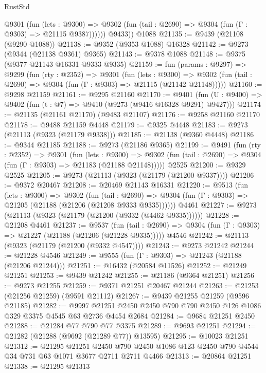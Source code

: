 \begin{lexlean}{RustStd}
\begin{coremodule}
{\begin{coremodule}
{{{{{{{{{{{{{{{{{{{{{{{{{{{{{{{{{{{{{{{{{{{{{{{{{{{{{{{            @9301
              (fun (lets : @9300) =>
              @9302 (fun (tail : @2690) => @9304 (fun (Γ : @9303) => @21115 @9387))))))
        @9433))
    @1088
@21135 := @9439 (@21108 (@9290 @1088))
@21138 := @9352 (@9353 @1088) @16328
@21142 := @9273 (@9344 (@21138 @9361) @9365)
@21143 := @9378 @1088
@21148 := @9375 (@9377 @21143 @16331 @9333 @9335)
@21159 := fun (params : @9297) =>
  @9299
    (fun (rty : @2352) =>
    @9301
      (fun (lets : @9300) =>
      @9302 (fun (tail : @2690) => @9304 (fun (Γ : @9303) => @21115 (@21142 @21148)))))
@21160 := @9298 @21159
@21161 := @9295 @21160
@21170 := @9401
    (fun (U : @9400) => @9402 (fun (t : @7) => @9410 (@9273 (@9416 @16328 @9291) @9427)))
@21174 := @21135 (@21161 @21170) (@9483 @21107)
@21176 := @9258 @21160 @21170
@21178 := @9488 @21159 @4448
@21179 := @9325 @4448
@21183 := @9273 (@21113 (@9323 (@21179 @9338)))
@21185 := @21138 (@9360 @4448)
@21186 := @9344 @21185
@21188 := @9273 (@21186 @9365)
@21199 := @9491
    (fun (rty : @2352) =>
    @9301
      (fun (lets : @9300) =>
      @9302 (fun (tail : @2690) => @9304 (fun (Γ : @9303) => @21183 (@21188 @21148)))))
    @2525
@21200 := @9329 @2525
@21205 := @9273 (@21113 (@9323 (@21179 (@21200 @9337))))
@21206 := @9372 @20467
@21208 := @20469 @21143 @16331
@21220 := @9513
    (fun (lets : @9300) =>
    @9302
      (fun (tail : @2690) =>
      @9304 (fun (Γ : @9303) => @21205 (@21188 (@21206 (@21208 @9333 @9335))))))
    @4461
@21227 := @9273 (@21113 (@9323 (@21179 (@21200 (@9332 (@4462 @9335))))))
@21228 := @21208 @4461
@21237 := @9537
    (fun (tail : @2690) => @9304 (fun (Γ : @9303) => @21227 (@21188 (@21206 (@21228 @9335)))))
    @4546
@21242 := @21113 (@9323 (@21179 (@21200 (@9332 @4547))))
@21243 := @9273 @21242
@21244 := @21228 @4546
@21249 := @9555 (fun (Γ : @9303) => @21243 (@21188 (@21206 @21244)))
@21251 := @16432 (@20584 @11526)
@21252 := @21249 @21251
@21253 := @9439 @21242
@21255 := @21186 (@9364 @21251)
@21256 := @9273 @21255
@21259 := @9371 @21251 @20467 @21244
@21263 := @21253 (@21256 @21259) (@9591 @21112)
@21267 := @9439 @21255 @21259 (@9596 @21185)
@21282 := @9997 @21251 @2450 @2450 @790 @790 @2450 @126 @1086 @329 @3375 @4545 @63 @2736 @4454 @2684
@21284 := @9684 @21251 @2450
@21288 := @21284 @77 @790 @77 @3375
@21289 := @9693 @21251
@21294 := @21282 (@21288 (@9692 (@21289 @77)) @13595)
@21295 := @10023 @21251
@21312 := @21295
    @21251
    @2450
    @790
    @2450
    @1086
    @123
    @2450
    @790
    @4544
    @34
    @731
    @63
    @1071
    @3677
    @2711
    @2711
    @4466
@21313 := @20864 @21251
@21338 := @21295
    @21313
}}}}}}}}}}}}}}}}}}}}}}}}}}}}}}}}}}}}}}}}}}}}}}}}}}}}}}}
\end{coremodule}}
\end{coremodule}
\end{lexlean}
